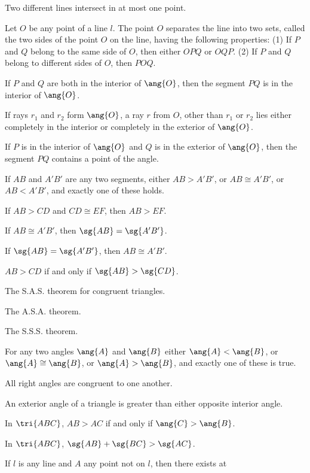 \documentclass[11pt]{book}
\theoremstyle{bkplain}
\theoremstyle{XIplainnote}
\theoremstyle{bkplain}
\theoremstyle{bkplain}
\begin{document}
\begin{applist}
\item Two different lines intersect in at most one point.
\item Let $O$ be any point of a line $l$. The point $O$ separates the line
      into two sets, called the two sides of the point $O$ on the line,
      having the following properties: (1) If $P$ and $Q$ belong to the same
      side of $O$, then either $OPQ$ or $OQP$. (2) If $P$ and $Q$ belong to
      different sides of $O$, then $POQ$.
\item If $P$ and $Q$ are both in the interior of $\ang{O}$, then the segment
      $PQ$ is in the interior of $\ang{O}$.
\item If rays $r_1$ and $r_2$ form $\ang{O}$, a ray $r$ from $O$, other than
      $r_1$ or $r_2$ lies either completely in the interior or completely in
      the exterior of $\ang{O}$.
\item If $P$ is in the interior of $\ang{O}$ and $Q$ is in the exterior of
      $\ang{O}$, then the segment $PQ$ contains a point of the angle.
\item If $AB$ and $A'B'$ are any two segments, either $AB > A'B'$, or
      $AB \cong A'B'$, or $AB < A'B'$, and exactly one of these holds.
\item If $AB > CD$ and $CD \cong EF$, then $AB > EF$.
\item If $AB \cong A'B'$, then $\sg{AB} = \sg{A'B'}$.
\item If $\sg{AB} = \sg{A'B'}$, then $AB \cong A'B'$.
\item $AB > CD$ if and only if $\sg{AB} > \sg{CD}$.
\item The S.A.S. theorem for congruent triangles.
\item The A.S.A. theorem.
\item The S.S.S. theorem.
\item For any two angles $\ang{A}$ and $\ang{B}$ either
      $\ang{A} < \ang{B}$, or $\ang{A} \cong \ang{B}$, or
      $\ang{A} > \ang{B}$, and exactly one of these is true.
\item All right angles are congruent to one another.
\item An exterior angle of a triangle is greater than either opposite
      interior angle.
\item In $\tri{ABC}$, $AB > AC$ if and only if $\ang{C} > \ang{B}$.
\item In $\tri{ABC}$, $\sg{AB} + \sg{BC} > \sg{AC}$.
\item If $l$ is any line and $A$ any point not on $l$, then there exists at

\end{applist}
\end{document}
